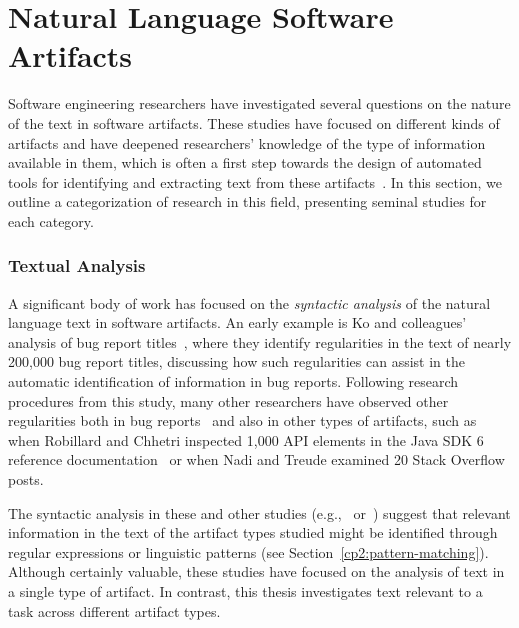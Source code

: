 \section{Natural Language Software Artifacts}
\label{cp2:text-in-se}




Software engineering researchers
have investigated several questions on the nature of the text in software artifacts.
These studies have focused on different kinds of artifacts and have deepened researchers' knowledge of the type of information available in them,
 which is often a first step towards the design of automated tools 
for identifying and extracting text from these artifacts~\cite{Arya2019, Maalej2013}.
In this section, we outline a categorization of research in this field, presenting 
seminal studies for each category.



\subsubsection{Textual Analysis} 

A significant body of work has 
focused on the \textit{syntactic analysis} of the natural language text 
in software artifacts. An early example
is Ko and colleagues' analysis of bug report titles~\cite{Ko2006},
where they identify regularities in the text of nearly 200,000 bug report titles,
discussing how such regularities can 
assist in the automatic identification 
of information in bug reports. 
Following research procedures from this study, many other researchers have 
observed other regularities both in bug reports~\cite{Rastkar2010, Chaparro2016}
and also in other types of artifacts, such as 
when Robillard  and Chhetri inspected 1,000 API elements in the Java SDK 6 
reference documentation~\cite{Maalej2013} or when 
Nadi and Treude examined 20 Stack Overflow posts.


The syntactic analysis in these and other studies (e.g.,~\cite{chaparro2019} or~\cite{lin2019})
suggest that relevant information in the text  
of the artifact types studied 
might be identified through regular expressions or 
linguistic patterns (see Section~\ref{cp2:pattern-matching}).
Although certainly valuable, these studies have focused on the analysis of 
text in a single type of artifact. In contrast, this thesis investigates 
text relevant to a task across different artifact types.





